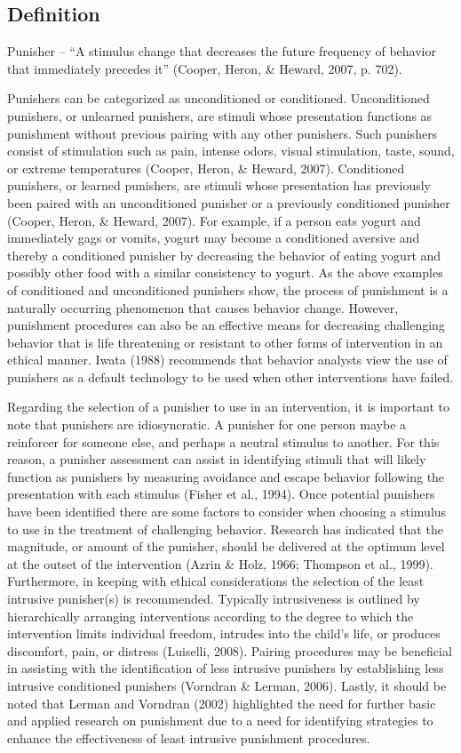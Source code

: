 \subsection{Definition}
Punisher – ``A stimulus change that decreases the future frequency of behavior that immediately precedes it'' (Cooper, Heron, \& Heward, 2007, p. 702).  

Punishers can be categorized as unconditioned or conditioned. Unconditioned punishers, or unlearned punishers, are stimuli whose presentation functions as punishment without previous pairing with any other punishers. Such punishers consist of stimulation such as pain, intense odors, visual stimulation, taste, sound, or extreme temperatures (Cooper, Heron, \& Heward, 2007).  Conditioned punishers, or learned punishers, are stimuli whose presentation has previously been paired with an unconditioned punisher or a previously conditioned punisher (Cooper, Heron, \& Heward, 2007).   For example, if a person eats yogurt and immediately gags or vomits, yogurt may become a conditioned aversive and thereby a conditioned punisher by decreasing the behavior of eating yogurt and possibly other food with a similar consistency to yogurt.  As the above examples of conditioned and unconditioned punishers show, the process of punishment is a naturally occurring phenomenon that causes behavior change.  However, punishment procedures can also be an effective means for decreasing challenging behavior that is life threatening or resistant to other forms of intervention in an ethical manner.  Iwata (1988) recommends that behavior analysts view the use of punishers as a default technology to be used when other interventions have failed.  

Regarding the selection of a punisher to use in an intervention, it is important to note that punishers are idiosyncratic. A punisher for one person maybe a reinforcer for someone else, and perhaps a neutral stimulus to another. For this reason, a punisher assessment can assist in identifying stimuli that will likely function as punishers by measuring avoidance and escape behavior following the presentation with each stimulus (Fisher et al., 1994). Once potential punishers have been identified there are some factors to consider when choosing a stimulus to use in the treatment of challenging behavior. Research has indicated that the magnitude, or amount of the punisher, should be delivered at the optimum level at the outset of the intervention (Azrin \& Holz, 1966; Thompson et al., 1999).  Furthermore, in keeping with ethical considerations the selection of the least intrusive punisher(s) is recommended.  Typically intrusiveness is outlined by hierarchically arranging interventions according to the degree to which the intervention limits individual freedom, intrudes into the child's life, or produces discomfort, pain, or distress (Luiselli, 2008). Pairing procedures may be beneficial in assisting with the identification of less intrusive punishers by establishing less intrusive conditioned punishers (Vorndran \& Lerman, 2006).  Lastly, it should be noted that Lerman and Vorndran (2002) highlighted the need for further basic and applied research on punishment due to a need for identifying strategies to enhance the effectiveness of least intrusive punishment procedures. 
%
